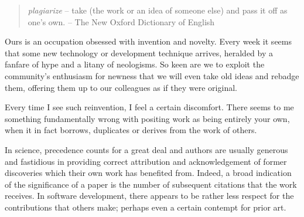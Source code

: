 \documentclass{article}
\begin{document}
\begin{quote}
\emph{plagiarize} -- take (the work or an idea of someone else) and pass it
off as one's own. -- The New Oxford Dictionary of English
\end{quote}

Ours is an occupation obsessed with invention and novelty. Every week it
seems that some new technology or development technique arrives,
heralded by a fanfare of hype and a litany of neologisms. So keen are we
to exploit the community's enthusiasm for newness that we will even take
old ideas and rebadge them, offering them up to our colleagues as if
they were original.

Every time I see such reinvention, I feel a certain discomfort. There
seems to me something fundamentally wrong with positing work as being
entirely your own, when it in fact borrows, duplicates or derives from
the work of others.

In science, precedence counts for a great deal and authors are usually
generous and fastidious in providing correct attribution and
acknowledgement of former discoveries which their own work has benefited
from. Indeed, a broad indication of the significance of a paper is the
number of subsequent citations that the work receives. In software
development, there appears to be rather less respect for the
contributions that others make; perhaps even a certain contempt for
prior art.
\end{document}

